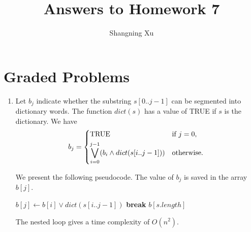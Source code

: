 \documentclass{article}
\title{Answers to Homework 7}
\author{Shangning Xu}
\begin{document}
\maketitle

\section{Graded Problems}

\begin{enumerate}
    \item Let $b_j$ indicate whether the substring $s[0..j - 1]$ can be segmented into dictionary words. The function $dict(s)$ has a value of TRUE if $s$ is the dictionary. We have
    \[
        b_j = \begin{dcases*}
            \mathrm{TRUE} & if $j = 0$,\\
             \bigvee_{i = 0}^{j - 1} (b_i \land dict(s[i..j - 1])) & otherwise.
        \end{dcases*}
    \]

    We present the following pseudocode. The value of $b_j$ is saved in the array $b[j]$.
    \begin{algorithmic}[1]
                \State $b[j] \gets b[i] \lor dict(s[i..j - 1])$
                    \State \textbf{break}
                \EndIf
            \EndFor
        \EndFor
        \State \Return $b[s.length]$
    \end{algorithmic}

    The nested loop gives a time complexity of $O(n^2)$.


\end{enumerate}
\end{document}
